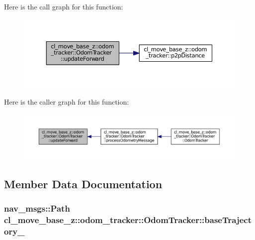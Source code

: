 Here is the call graph for this function\+:
\nopagebreak
\begin{figure}[H]
\begin{center}
\leavevmode
\includegraphics[width=350pt]{classcl__move__base__z_1_1odom__tracker_1_1OdomTracker_aa63ebddd9f6e42b0330738af82b60f99_cgraph}
\end{center}
\end{figure}




Here is the caller graph for this function\+:
\nopagebreak
\begin{figure}[H]
\begin{center}
\leavevmode
\includegraphics[width=350pt]{classcl__move__base__z_1_1odom__tracker_1_1OdomTracker_aa63ebddd9f6e42b0330738af82b60f99_icgraph}
\end{center}
\end{figure}




\subsection{Member Data Documentation}
\subsubsection[{\texorpdfstring{base\+Trajectory\+\_\+}{baseTrajectory_}}]{\setlength{\rightskip}{0pt plus 5cm}nav\+\_\+msgs\+::\+Path cl\+\_\+move\+\_\+base\+\_\+z\+::odom\+\_\+tracker\+::\+Odom\+Tracker\+::base\+Trajectory\+\_\+\hspace{0.3cm}{\ttfamily [protected]}}\hypertarget{classcl__move__base__z_1_1odom__tracker_1_1OdomTracker_a466d18a86df049f0f680e043bb5ea91f}{}\label{classcl__move__base__z_1_1odom__tracker_1_1OdomTracker_a466d18a86df049f0f680e043bb5ea91f}



